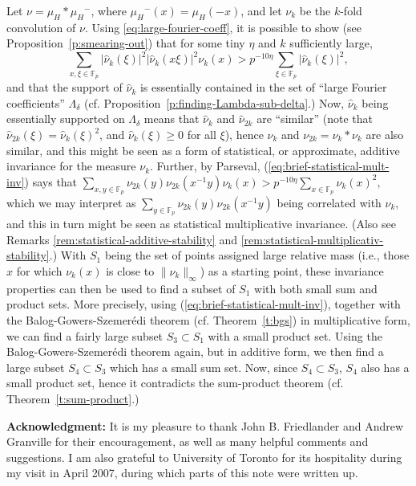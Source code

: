 \documentclass[11pt]{amsart}
\newcommand{\fp}{\mathbb{F}_p}
\newcommand{\muh}{{\mu_H}}
\newcommand{\nuhat}{{\widehat{\nu}}}
\newcommand{\supnorm}[1]{\|#1\|_\infty}   %
\begin{document}
Let $\nu = \muh \ast \muh^-$, where $\muh^-(x) = \muh(-x)$, and
let $\nu_k$ be the $k$-fold convolution of $\nu$.  Using
\eqref{eq:large-fourier-coeff}, it is possible to show  (see
Proposition~\ref{p:smearing-out}) that for some tiny $\eta$ and
$k$ sufficiently large,
\begin{equation}
\label{eq:brief-statistical-mult-inv}
\sum_{x, \xi \in \fp}
|\nuhat_k(\xi)|^2 |\nuhat_k(x \xi)|^2 \nu_k(x)
>
p^{-10\eta} \sum_{\xi \in \fp} |\nuhat_k(\xi)|^2,
\end{equation}
and that the support of $\nuhat_k$ is essentially contained in
the set of ``large Fourier coefficients'' $\Lambda_\delta$
(cf. Proposition~\ref{p:finding-Lambda-sub-delta}.)
%
Now, 
$\nuhat_k$ being essentially supported on $\Lambda_\delta$ means that 
$\nuhat_k$ and $\nuhat_{2k}$ are ``similar'' (note that 
$\nuhat_{2k}(\xi) = \nuhat_k(\xi)^2$, and $\nuhat_k(\xi)\geq 0$ for all
$\xi$), 
hence  $\nu_k$ and $\nu_{2k}= \nu_k \ast \nu_k$ are also similar,
and this  might be seen as a form of statistical, or approximate,
additive invariance 
for the
measure $\nu_k$.
Further, by Parseval, (\ref{eq:brief-statistical-mult-inv}) says that 
$
\sum_{x,y \in \fp}
\nu_{2k}(y) \nu_{2k}(x^{-1} y) 
\nu_k(x)
>
p^{-10\eta} \sum_{x \in \fp} \nu_k(x)^2,
$
which we may interpret as $\sum_{ y \in \fp} \nu_{2k}(y) \nu_{2k}(x^{-1}
y)$ being correlated with $\nu_k$, and this in turn might be seen as 
statistical  multiplicative invariance.  
(Also see Remarks \ref{rem:statistical-additive-stability} and
\ref{rem:statistical-multiplicativ-stability}.)
%
With $S_1$ being the set of points assigned large relative mass (i.e.,
those $x$ for which 
$\nu_k(x)$ is close to $\supnorm{\nu_k}$)
 as a starting point, these 
invariance properties can then be used to find a subset of $S_1$ with
both small sum 
and product sets.
%
More precisely, using (\ref{eq:brief-statistical-mult-inv}), together with the
Balog-Gowers-Szemer\'edi theorem (cf. 
Theorem~\ref{t:bgs}) in multiplicative form, we can find a fairly
large subset $S_3 \subset S_1$ with a small product set.  Using the
Balog-Gowers-Szemer\'edi theorem again, but in additive form, we
then find a large subset $S_4 \subset S_3$ which has a small sum
set.  Now, since $S_4 \subset S_3$, $S_4$ also has a small product
set, hence it contradicts the sum-product theorem (cf.
Theorem~\ref{t:sum-product}.)

{\bf Acknowledgment:} It is my pleasure to thank John B. Friedlander
and Andrew Granville for their encouragement, as well as many helpful
comments and suggestions.  I am also grateful to University of Toronto
for its hospitality during my visit in April 2007, during which 
parts of this note were written up.
\end{document}
